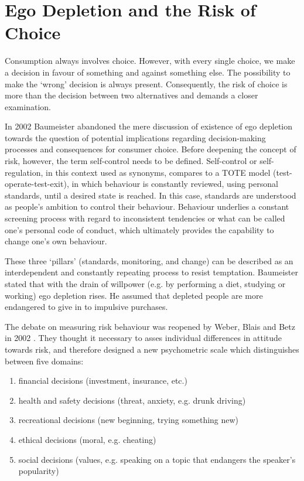 \section{Ego Depletion and the Risk of Choice}\label{sec:2.2}
Consumption always involves choice. However, with every single choice, we make a decision in favour of something and against something else. The possibility to make the ‘wrong’ decision is always present. Consequently, the risk of choice is more than the decision between two alternatives and demands a closer examination.\par
In 2002 Baumeister \citep{baumeister2002yielding} abandoned the mere discussion of existence of ego depletion towards the question of potential implications regarding decision-making processes and consequences for consumer choice. Before deepening the concept of risk, however, the term self-control needs to be defined. Self-control or self-regulation, in this context used as synonyms, compares to a TOTE model (test-operate-test-exit), in which behaviour is constantly reviewed, using personal standards, until a desired state is reached. In this case, standards are understood as people’s ambition to control their behaviour. Behaviour underlies a constant screening process with regard to inconsistent tendencies or what can be called one’s personal code of conduct, which ultimately provides the capability to change one’s own behaviour.\par
These three ‘pillars’ (standards, monitoring, and change) can be described as an interdependent and constantly repeating process to resist temptation. Baumeister stated that with the drain of willpower (e.g. by performing a diet, studying or working) ego depletion rises. He assumed that depleted people are more endangered to give in to impulsive purchases. \par
The debate on measuring risk behaviour was reopened by Weber, Blais and Betz in 2002 \citep{weber2002domain}. They thought it necessary to asses individual differences in attitude towards risk, and therefore designed a new psychometric scale which distinguishes between five domains: 
\begin{enumerate}
	\item financial decisions (investment, insurance, etc.)
	\item health and safety decisions (threat, anxiety, e.g. drunk driving)
	\item recreational decisions (new beginning, trying something new)
	\item ethical decisions (moral, e.g. cheating) 
	\item social decisions (values, e.g. speaking on a topic that endangers the speaker's popularity)
\end{enumerate}\
